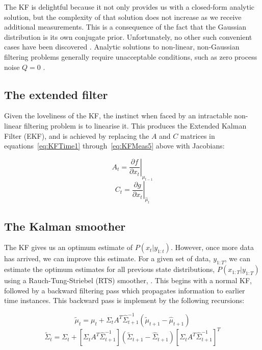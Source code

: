 The KF is delightful because it not only provides us with a closed-form analytic solution, but the complexity of that solution does not increase as we receive additional measurements. This is a consequence of the fact that the Gaussian distribution is its own conjugate prior. Unfortunately, no other such convenient cases have been discovered \cite{Daum2005}. Analytic solutions to non-linear, non-Gaussian filtering problems generally require unacceptable conditions, such as zero process noise $Q=0$ \cite{Daum2005}.

\subsection{The extended filter}

Given the loveliness of the KF, the instinct when faced by an intractable non-linear filtering problem is to linearise it. This produces the Extended Kalman Filter (EKF), and is achieved by replacing the $A$ and $C$ matrices in equations~\ref{eq:KFTime1} through~\ref{eq:KFMeas5} above with Jacobians:

\begin{equation}
A_t = \left . \frac{\partial f}{\partial x_t} \right \vert _{\mu_{t-1}}
\label{eq:EKF1}
\end{equation}
\begin{equation}
C_t = \left . \frac{\partial g}{\partial x_t} \right \vert _{\hat{\mu}_t}
\label{eq:EKF2}
\end{equation}

\subsection{The Kalman smoother}

The KF gives us an optimum estimate of $P(x_t|y_{1:t})$. However, once more data has arrived, we can improve this estimate. For a given set of data, $y_{1:T}$, we can estimate the optimum estimates for all previous state distributions, $P(x_{1:T}| y_{1:T})$ using a Rauch-Tung-Striebel (RTS) smoother, \cite{Rauch1965}. This begins with a normal KF, followed by a backward filtering pass which propagates information to earlier time instances. This backward pass is implement by the following recursions:

\begin{equation}
\tilde{\mu}_t = \mu_{t} + \Sigma_t A^T \hat{\Sigma}_{t+1}^{-1} (\tilde{\mu}_{t+1} - \hat{\mu}_{t+1})
\label{eq:}
\end{equation}
\begin{equation}
\tilde{\Sigma}_t = \Sigma_{t} + [\Sigma_t A^T \hat{\Sigma}_{t+1}^{-1}] (\tilde{\Sigma}_{t+1} - \hat{\Sigma}_{t+1}) [\Sigma_t A^T \hat{\Sigma}_{t+1}^{-1}]^T
\label{eq:}
\end{equation}

